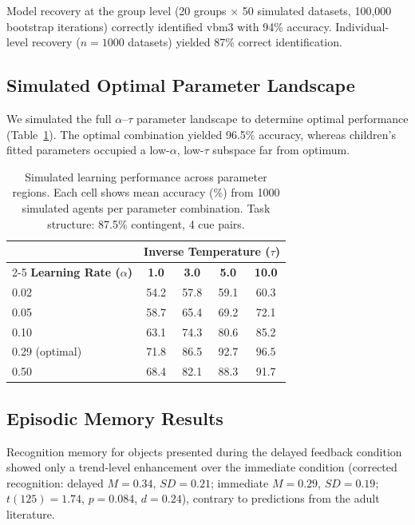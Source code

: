 \documentclass[11pt]{article}
\begin{document}
Model recovery at the group level (20 groups $\times$ 50 simulated datasets, 100,000 bootstrap iterations) correctly identified vbm3 with 94\% accuracy. Individual-level recovery ($n = 1000$ datasets) yielded 87\% correct identification.

\subsection{Simulated Optimal Parameter Landscape}

We simulated the full $\alpha$--$\tau$ parameter landscape to determine optimal performance (Table~\ref{tab:landscape}). The optimal combination yielded 96.5\% accuracy, whereas children's fitted parameters occupied a low-$\alpha$, low-$\tau$ subspace far from optimum.

\begin{table}[H]
\centering
\caption{Simulated learning performance across parameter regions. Each cell shows mean accuracy (\%) from 1000 simulated agents per parameter combination. Task structure: 87.5\% contingent, 4 cue pairs.}
\label{tab:landscape}
\begin{tabular}{lcccc}
\toprule
& \multicolumn{4}{c}{\textbf{Inverse Temperature ($\tau$)}} \\
\cmidrule(lr){2-5}
\textbf{Learning Rate ($\alpha$)} & \textbf{1.0} & \textbf{3.0} & \textbf{5.0} & \textbf{10.0} \\
\midrule
0.02 & 54.2 & 57.8 & 59.1 & 60.3 \\
0.05 & 58.7 & 65.4 & 69.2 & 72.1 \\
0.10 & 63.1 & 74.3 & 80.6 & 85.2 \\
0.29 (optimal) & 71.8 & 86.5 & 92.7 & $\mathbf{96.5}$ \\
0.50 & 68.4 & 82.1 & 88.3 & 91.7 \\
\bottomrule
\end{tabular}
\end{table}

\subsection{Episodic Memory Results}

Recognition memory for objects presented during the delayed feedback condition showed only a trend-level enhancement over the immediate condition (corrected recognition: delayed $M = 0.34$, $SD = 0.21$; immediate $M = 0.29$, $SD = 0.19$; $t(125) = 1.74$, $p = 0.084$, $d = 0.24$), contrary to predictions from the adult literature.
\end{document}
